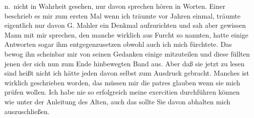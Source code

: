 \documentclass[
]{article}
\begin{document}
n.~nicht in Wahrheit gesehen, nur davon sprechen hören in Worten. Einer
beschrieb es mir zum ersten Mal wenn ich träumte vor Jahren einmal,
träumte eigentlich nur davon G. Mahler ein Denkmal aufzurichten und sah
aber gewissen Mann mit mir sprechen, den manche wirklich aus Furcht so
nannten, hatte einige Antworten sogar ihm entgegenzusetzen obwohl auch
ich mich fürchtete. Das bewog ihn scheinbar mir von seinen Gedanken
einige mitzuteilen und diese füllten jenen der sich nun zum Ende
hinbewegten Band aus. Aber daß sie jetzt zu lesen sind heißt nicht ich
hätte jeden davon selbst zum Ausdruck gebracht. Manches ist wirklich
geschrieben worden, das müssen mir die patres glauben wenn sie mich
prüfen wollen. Ich habe nie so erfolgreich meine exercitien durchführen
können wie unter der Anleitung des Alten, auch das sollte Sie davon
abhalten mich auszuschließen.
\end{document}
